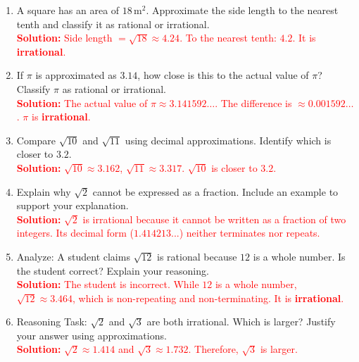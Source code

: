 \documentclass[10pt]{article}
\begin{document}
\begin{tcolorbox}[colframe=black!60, colback=white, 
coltitle=black, colbacktitle=black!15, fonttitle=\bfseries\Large, 
title=Problems, halign title=center, left=10pt, right=10pt, top=10pt, bottom=60pt]
\begin{enumerate}[start=8, itemsep=5em]
    \item A square has an area of \( 18 \, \text{m}^2 \). Approximate the side length to the nearest tenth and classify it as rational or irrational.\\
    \textcolor{red}{\textbf{Solution:} Side length \(= \sqrt{18} \approx 4.24\). To the nearest tenth: \(4.2\). It is \textbf{irrational}.}

    \item If \( \pi \) is approximated as \( 3.14 \), how close is this to the actual value of \( \pi \)? Classify \( \pi \) as rational or irrational.\\
    \textcolor{red}{\textbf{Solution:} The actual value of \( \pi \approx 3.141592\ldots \). The difference is \( \approx 0.001592\ldots \). \( \pi \) is \textbf{irrational}.}

    \item Compare \( \sqrt{10} \) and \( \sqrt{11} \) using decimal approximations. Identify which is closer to \( 3.2 \).\\
    \textcolor{red}{\textbf{Solution:} \( \sqrt{10} \approx 3.162 \), \( \sqrt{11} \approx 3.317 \). \( \sqrt{10} \) is closer to \(3.2\).}

    \item Explain why \( \sqrt{2} \) cannot be expressed as a fraction. Include an example to support your explanation.\\
    \textcolor{red}{\textbf{Solution:} \( \sqrt{2} \) is irrational because it cannot be written as a fraction of two integers. Its decimal form (\(1.414213...\)) neither terminates nor repeats.}

    \item Analyze: A student claims \( \sqrt{12} \) is rational because \( 12 \) is a whole number. Is the student correct? Explain your reasoning.\\
    \textcolor{red}{\textbf{Solution:} The student is incorrect. While \(12\) is a whole number, \( \sqrt{12} \approx 3.464 \), which is non-repeating and non-terminating. It is \textbf{irrational}.}

    \item Reasoning Task: \( \sqrt{2} \) and \( \sqrt{3} \) are both irrational. Which is larger? Justify your answer using approximations.\\
    \textcolor{red}{\textbf{Solution:} \( \sqrt{2} \approx 1.414 \) and \( \sqrt{3} \approx 1.732 \). Therefore, \( \sqrt{3} \) is larger.}


\end{enumerate}
\end{tcolorbox}
\end{document}

